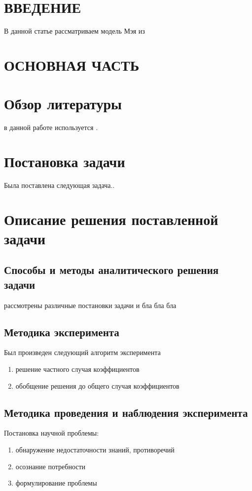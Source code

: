\documentclass[12pt]{article}
\begin{document}
\cleardoublepage                     
{}         

\tableofcontents

\cleardoublepage                   
{}         

\setcounter{page}{4}  

\section*{ВВЕДЕНИЕ}

В данной статье рассматриваем модель Мэя из \cite{Dolgiy} 
\newpage
\section*{ОСНОВНАЯ ЧАСТЬ}
\section{Обзор литературы}
в данной работе используется \cite{Pimenov}.
\section{Постановка задачи}
Была поставлена следующая задача..
\section{Описание решения поставленной задачи}
\subsection{Способы и методы аналитического решения задачи}
рассмотрены различные постановки задачи и бла бла бла

\subsection{Методика эксперимента}
Был произведен следующий алгоритм эксперимента
\begin{enumerate}
\item решение частного случая коэффициентов
\item обобщение решения до общего случая коэффициентов
\end{enumerate}
\subsection{Методика проведения и наблюдения эксперимента}
Постановка научной проблемы:
\begin{enumerate}
\item обнаружение недостаточности знаний, противоречий
\item осознание потребности
\item формулирование проблемы
\end{enumerate}
\end{document}
